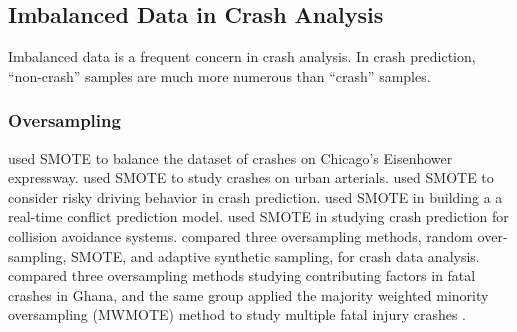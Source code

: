 








\subsection{Imbalanced Data in Crash Analysis}

Imbalanced data is a frequent concern in crash analysis.  In crash prediction, ``non-crash'' samples are much more numerous than ``crash'' samples. 

\subsubsection{Oversampling}

%
\cite{PARSA2019202} used SMOTE to balance the dataset of crashes on Chicago's Eisenhower expressway.  
%
\cite{LI2020105371} used SMOTE to study crashes on urban arterials.  
%
\cite{GUO2021106328} used SMOTE to consider risky driving behavior in crash prediction.  
%
\cite{ORSINI2021106382} used SMOTE in building a a real-time conflict prediction model.
%
\cite{ELAMRANIABOUELASSAD2020102708} used SMOTE in studying crash prediction for collision avoidance systems.  
%
\cite{MORRIS2021106240} compared three oversampling methods, 
random over-sampling, SMOTE, and adaptive synthetic sampling, for crash data analysis.  
%
\cite{YAHAYA2021105936} compared three oversampling methods studying contributing factors in fatal crashes in Ghana, and the same group applied the majority weighted minority oversampling (MWMOTE) method to study multiple fatal injury crashes \citep{YAHAYA2021105851}.


